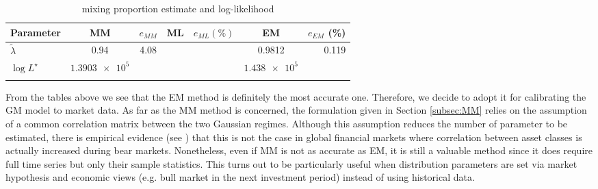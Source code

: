 \begin{table}
	\centering
	\begin{tabular}{@{}lcccccr@{}} \toprule
		Parameter & MM & $e_{MM}$ & ML & $e_{ML} (\%)$ & EM & $e_{EM}$ (\%)\\ \midrule
		$\widetilde{\lambda}$  & 0.94  & 4.08 & & & 0.9812 & 0.119 \\
		\addlinespace[0.5em]
		$\log L^{\star}$ & $\num{1.3903e+5}$ & & & & $\num{1.438e+5}$ & \\ \bottomrule
		\addlinespace[0.5em]
	\end{tabular}
	\caption{mixing proportion estimate and log-likelihood}
	\label{tab:calibration3}
\end{table}
From the tables above we see that the EM method is definitely the most accurate one. Therefore, we decide to adopt it for calibrating the GM model to market data. As far as the MM method is concerned, the formulation given in Section \ref{subsec:MM} relies on the assumption of a common correlation matrix between the two Gaussian regimes. Although this assumption reduces the number of parameter to be estimated, there is empirical evidence (see \cite{Campbell2002}) that this is not the case in global financial markets where correlation between asset classes is actually increased during bear markets. Nonetheless, even if MM is not as accurate as EM, it is still a valuable method since it does require full time series but only their sample statistics. This turns out to be particularly useful when distribution parameters are set via market hypothesis and economic views (e.g. bull market in the next investment period) instead of using historical data.
